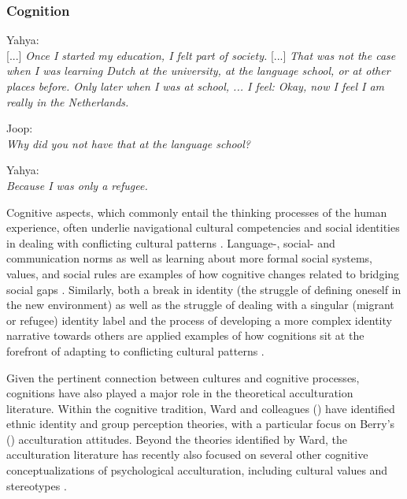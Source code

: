 \documentclass[man, 12pt, a4paper, mask]{apa7}
\begin{document}
\subsubsection{Cognition}
\begin{displayquote}
    Yahya:\\
    {[...]} \textit{Once I started my education, I felt part of society.} {[...]} \textit{That was not the case when I was learning Dutch at the university, at the language school, or at other places before. Only later when I was at school, ... I feel: Okay, now I feel I am really in the Netherlands.}
    
    Joop:\\
    \textit{Why did you not have that at the language school?}
    
    Yahya:\\
    \textit{Because I was only a refugee.}
\end{displayquote}

Cognitive aspects, which commonly entail the thinking processes of the human experience, often underlie navigational cultural competencies and social identities in dealing with conflicting cultural patterns \citep[][]{Padilla2003}. Language-, social- and communication norms as well as learning about more formal social systems, values, and social rules are examples of how cognitive changes related to bridging social gaps \citep[e.g.,][]{Gelfand2011, Nisbett2002}. Similarly, both a break in identity (the struggle of defining oneself in the new environment) as well as the struggle of dealing with a singular (migrant or refugee) identity label and the process of developing a more complex identity narrative towards others are applied examples of how cognitions sit at the forefront of adapting to conflicting cultural patterns \citep[e.g.,][]{Verkuyten2012}.

Given the pertinent connection between cultures and cognitive processes, cognitions have also played a major role in the theoretical acculturation literature. Within the cognitive tradition, Ward and colleagues (\citeyear{Ward2001, Ward2019}) have identified ethnic identity and group perception theories, with a particular focus on Berry's (\citeyear{Berry1997b}) acculturation attitudes. Beyond the theories identified by Ward, the acculturation literature has recently also focused on several other cognitive conceptualizations of psychological acculturation, including cultural values \citep[e.g.,][]{Marin2003} and stereotypes \citep[e.g.,][]{Stanciu2018}. 
\end{document}
